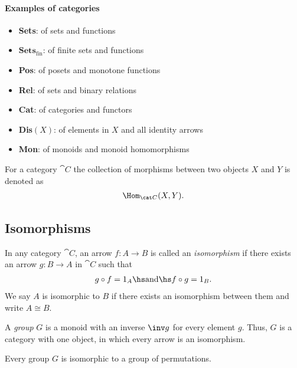 \documentclass{article}
\begin{document}
\paragraph{Examples of categories}
\begin{itemize}
	\item \textbf{Sets}: of sets and functions
	\item $\textbf{Sets}_\text{fin}$: of finite sets and functions
	\item \textbf{Pos}: of posets and monotone functions
	\item \textbf{Rel}: of sets and binary relations
	\item \textbf{Cat}: of categories and functors
	\item \textbf{Dis$(X)$}: of elements in $X$ and all identity arrows
	\item \textbf{Mon}: of monoids and monoid homomorphisms
\end{itemize}

\begin{definition}
	For a category $\cat C$ the collection of morphisms between two objects
	$X$ and $Y$ is denoted as
	\begin{align*}
		\Hom_{\cat C}(X,Y).
	\end{align*}
\end{definition}

\subsection{Isomorphisms}

\begin{definition}
	In any category $\cat{C}$, an arrow $f:A\to B$ is called an
	\emph{isomorphism} if there exists an arrow $g:B\to A$ in
	$\cat{C}$ such that
	\begin{align*}
		g\circ f = 1_A\hs\text{and}\hs f\circ g = 1_B.
	\end{align*}
	We say $A$ is isomorphic to $B$ if there exists an isomorphism
	between them and write $A\cong B$.
\end{definition}

\begin{definition}
	A \emph{group} $G$ is a monoid with an inverse $\inv g$ for every element $g$.
	Thus, $G$ is a category with one object, in which every arrow is an isomorphism.
\end{definition}

\begin{theorem}[Cayley]
	Every group $G$ is isomorphic to a group of permutations.
\end{theorem}
\end{document}
